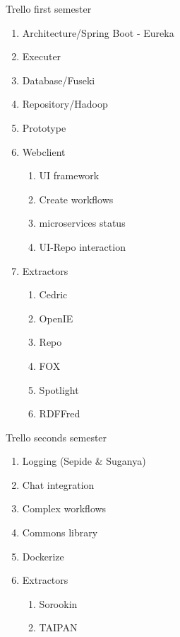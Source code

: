 \begin{frame}{Trello first semester}
	\begin{enumerate}
		\item Architecture/Spring Boot - Eureka
		\item Executer
		\item Database/Fuseki
		\item Repository/Hadoop
		\item Prototype
		\item Webclient 
		\begin{enumerate}
			\item UI framework
			\item Create workflows
			\item microservices status
			\item UI-Repo interaction
		\end{enumerate}
		\item Extractors
		\begin{enumerate}
			\item Cedric
			\item OpenIE
			\item Repo
			\item FOX
			\item Spotlight
			\item RDFFred
		\end{enumerate}
	\end{enumerate}
\end{frame}

\begin{frame}{Trello seconds semester}
	\begin{enumerate}
		\item Logging (Sepide \& Suganya)
		\item Chat integration
		\item Complex workflows
		\item Commons library
		\item Dockerize
		\item Extractors
		\begin{enumerate}
			\item Sorookin
			\item TAIPAN
		\end{enumerate}
	\end{enumerate}
\end{frame}